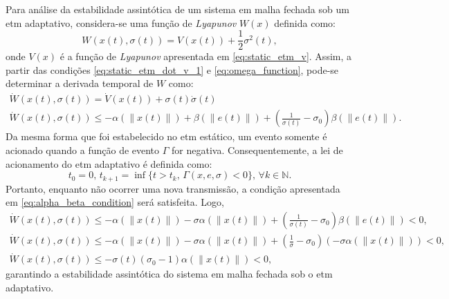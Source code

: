 Para análise da estabilidade assintótica de um sistema em malha fechada sob um \acrshort{etm} adaptativo, considera-se uma função de \textit{Lyapunov }$W(x)$ definida como: \begin{equation}
  W(x(t), \sigma(t)) = V(x(t)) + \frac{1}{2}\sigma^2(t),
\end{equation} onde $V(x)$ é a função de \textit{Lyapunov }apresentada em \eqref{eq:static_etm_v}. Assim, a partir das condições \eqref{eq:static_etm_dot_v_1} e \eqref{eq:omega_function}, pode-se determinar a derivada temporal de $W$ como: \begin{gather}
  \dot{W}(x(t), \sigma(t)) = \dot{V}(x(t)) + \sigma(t) \dot{\sigma}(t) \\[8pt]
  \dot{W}(x(t), \sigma(t)) \leq - \alpha(\|x(t)\|) + \beta(\|e(t)\|) + \left(\frac{1}{\sigma(t)} - \sigma_0\right)\beta(\|e(t)\|).
\end{gather} Da mesma forma que foi estabelecido no \acrshort{etm} estático, um evento somente é acionado quando a função de evento $\Gamma$ for negativa. Consequentemente, a lei de acionamento do \acrshort{etm} adaptativo é definida como: \begin{equation}
  t_0 = 0, \, t_{k+1} = \inf\{t > t_k, \, \Gamma(x, e, \sigma) < 0\}, \, \forall k \in \mathbb{N}. \label{eq:adaptative_event_triggering_law}
\end{equation} Portanto, enquanto não ocorrer uma nova transmissão, a condição apresentada em \eqref{eq:alpha_beta_condition} será satisfeita. Logo, \begin{gather}
  \dot{W}(x(t), \sigma(t)) \leq - \alpha(\|x(t)\|) - \sigma \alpha(\|x(t)\|) + \left(\frac{1}{\sigma(t)} - \sigma_0\right)\beta(\|e(t)\|) < 0, \\[8pt]
  \dot{W}(x(t), \sigma(t)) \leq - \alpha(\|x(t)\|) - \sigma \alpha(\|x(t)\|) + \left(\frac{1}{\sigma} - \sigma_0\right) (- \sigma \alpha(\|x(t)\|)) < 0, \\[8pt]
  \dot{W}(x(t), \sigma(t)) \leq - \sigma(t)(\sigma_0 - 1) \alpha(\|x(t)\|) < 0,
\end{gather} garantindo a estabilidade assintótica do sistema em malha fechada sob o \acrshort{etm} adaptativo.

